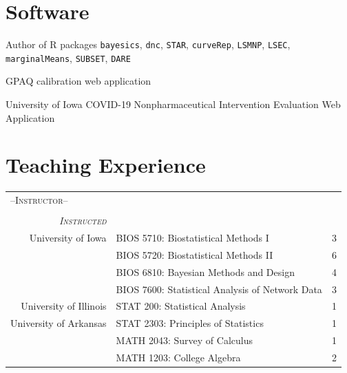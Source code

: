 \documentclass[11pt]{article}
\begin{document}
\vspace{0.5pc}
\printbibliography[title=Publications]


\vspace{1pc}
\section{Software}
\begin{description}
\item Author of R packages \verb!bayesics!, \verb!dnc!, \verb!STAR!, \verb!curveRep!, \verb!LSMNP!, \verb!LSEC!, \verb!marginalMeans!, \verb!SUBSET!, \verb!DARE!
\item GPAQ calibration web application 
\item University of Iowa COVID-19 Nonpharmaceutical Intervention Evaluation Web Application
\end{description}

\section{Teaching Experience}
\begin{tabular}{r|lc}
\multicolumn{3}{l}{\large--\textsc{Instructor}--\normalsize}\\
\multicolumn{1}{c}{}&&\pbox{4cm}{\hspace{1pc}\textsl{\textsc{Terms }}\\ \textsl{\textsc{Instructed}}}  \\ 
University of Iowa & BIOS 5710: Biostatistical Methods I & 3 \\
& BIOS 5720: Biostatistical Methods II & 6 \\
& BIOS 6810: Bayesian Methods and Design & 4 \\
& BIOS 7600: Statistical Analysis of Network Data & 3 \\
University of Illinois &STAT 200: Statistical Analysis & 1 \\
University of Arkansas & STAT 2303: Principles of Statistics & 1 \\
 &MATH 2043: Survey of Calculus & 1\\
& MATH 1203: College Algebra & 2 \\
\end{tabular}
\end{document}
